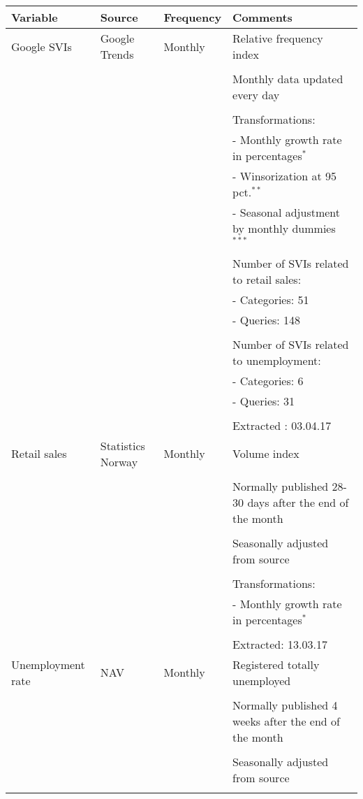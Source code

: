 \begin{table}[!t]
	\scriptsize
	\begin{tabularx}{\textwidth}{lllX}
		\toprule
		\textbf{Variable} & \textbf{Source} & \textbf{Frequency} & \textbf{Comments} \\
		\midrule
		Google SVIs & Google Trends & Monthly & Relative frequency index \\ \\
		& & & Monthly data updated every day \\ \\
		& & & Transformations: \\
		& & & - Monthly growth rate in percentages$^{*}$ \\
		& & & - Winsorization at 95 pct.$^{**}$ \\
		& & & - Seasonal adjustment by monthly dummies $^{***}$ \\ \\
		& & & Number of SVIs related to retail sales: \\
		& & & - Categories: 51 \\
		& & & - Queries: 148 \\ \\
		& & & Number of SVIs related to unemployment: \\
		& & & - Categories: 6 \\
		& & & - Queries: 31 \\ \\
		& & & Extracted : 03.04.17 \\
		\midrule
		Retail sales & Statistics Norway & Monthly & Volume index \\ \\
		& & & Normally published 28-30 days after the end of the month \\ \\
		& & & Seasonally adjusted from source \\ \\
		& & & Transformations: \\
		& & & - Monthly growth rate in percentages$^{*}$ \\ \\
		& & & Extracted: 13.03.17 \\
		\midrule
		Unemployment rate & NAV & Monthly &  Registered totally unemployed \\ \\
		& & & Normally published 4 weeks after the end of the month \\ \\
		& & & Seasonally adjusted from source \\ \\

\end{tabularx}
\end{table}
